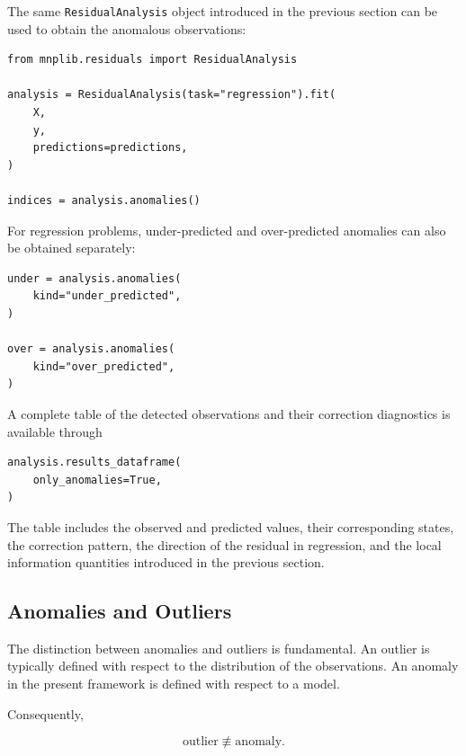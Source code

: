 The same \texttt{ResidualAnalysis} object introduced in the previous section
can be used to obtain the anomalous observations:

\begin{sourcecode}
{\scriptsize
\begin{verbatim}
from mnplib.residuals import ResidualAnalysis

analysis = ResidualAnalysis(task="regression").fit(
    X,
    y,
    predictions=predictions,
)

indices = analysis.anomalies()
\end{verbatim}}
\end{sourcecode}

For regression problems, under-predicted and over-predicted anomalies can also
be obtained separately:

\begin{sourcecode}
{\scriptsize
\begin{verbatim}
under = analysis.anomalies(
    kind="under_predicted",
)

over = analysis.anomalies(
    kind="over_predicted",
)
\end{verbatim}}
\end{sourcecode}

A complete table of the detected observations and their correction diagnostics
is available through

\begin{sourcecode}
{\scriptsize
\begin{verbatim}
analysis.results_dataframe(
    only_anomalies=True,
)
\end{verbatim}}
\end{sourcecode}

The table includes the observed and predicted values, their corresponding
states, the correction pattern, the direction of the residual in regression,
and the local information quantities introduced in the previous section.

\subsection*{Anomalies and Outliers}

The distinction between anomalies and outliers is fundamental. An outlier is
typically defined with respect to the distribution of the observations. An
anomaly in the present framework is defined with respect to a model.

Consequently,

\[
\text{outlier} \not\equiv \text{anomaly}.
\]

